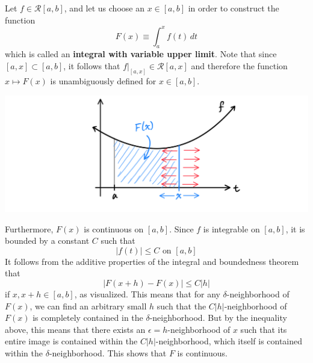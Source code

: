 \documentclass{article}
\begin{document}
      \begin{definition}
        Let $f \in \mathcal{R}[a, b]$, and let us choose an $x \in [a, b]$ in order to construct the function
        \[F(x) \equiv \int_a^x f(t)\,dt\]
        which is called an \textbf{integral with variable upper limit}. Note that since $[a, x] \subset [a, b]$, it follows that $f \big|_{[a,x]} \in \mathcal{R}[a, x]$ and therefore the function $x \mapsto F(x)$ is unambiguously defined for $x \in [a, b]$. 
        \begin{center}
            \includegraphics[scale=0.27]{img/Integral_with_Variable_Upper_Limit.PNG}
        \end{center}
        Furthermore, $F(x)$ is continuous on $[a, b]$. Since $f$ is integrable on $[a, b]$, it is bounded by a constant $C$ such that
        \[|f(t)| \leq C \text{ on } [a, b]\]
        It follows from the additive properties of the integral and boundedness theorem that 
        \[|F(x + h) - F(x)| \leq C|h|\]
        if $x, x + h \in [a, b]$, as visualized. This means that for any $\delta$-neighborhood of $F(x)$, we can find an arbitrary small $h$ such that the $C|h|$-neighborhood of $F(x)$ is completely contained in the $\delta$-neighborhood. But by the inequality above, this means that there exists an $\epsilon = h$-neighborhood of $x$ such that its entire image is contained within the $C|h|$-neighborhood, which itself is contained within the $\delta$-neighborhood. This shows that $F$ is continuous. 
      \end{definition}
\end{document}
